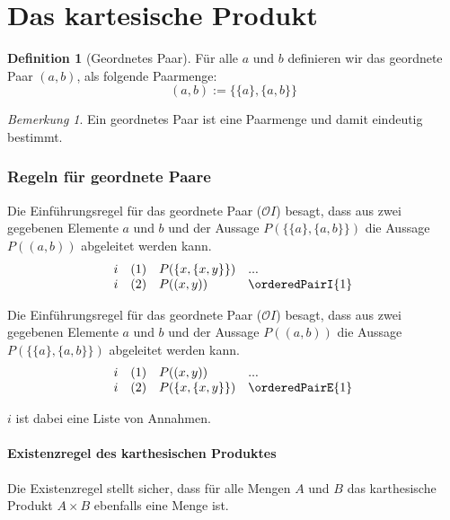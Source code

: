 \documentclass{book}
\theoremstyle{plain}
\theoremstyle{remark}
\newtheorem*{remark}{Bemerkung}
\theoremstyle{definition}
\newtheorem{definition}{Definition}[section]
\begin{document}
\section{Das kartesische Produkt}
\begin{definition}[Geordnetes Paar]
	Für alle \( a \) und \( b \) definieren wir das geordnete Paar \( (a,b) \), als folgende Paarmenge:
	\[
	(a, b) := \{ \{ a \}, \{ a, b \} \}
	\]
\end{definition}
\begin{remark}
	Ein geordnetes Paar ist eine Paarmenge und damit eindeutig bestimmt.
\end{remark}

\subsubsection{Regeln für geordnete Paare}
\label{rule:orderedPairI} \label{rule:orderedPairE}

Die Einführungsregel für das geordnete Paar (\( \mathcal{O}I \)) besagt, dass aus zwei gegebenen Elemente \( a \) und \( b \) und der Aussage \(P(\{ \{ a \}, \{ a, b \} \})\) die Aussage \(P((a,b))\) abgeleitet werden kann.
\[
\begin{array}{llll}
	i & (1) & P(\{x,\{x,y\}\}) & ... \\
	i & (2) & P((x,y)) & \orderedPairI{1} \\
\end{array}
\]

Die Einführungsregel für das geordnete Paar (\( \mathcal{O}I \)) besagt, dass aus zwei gegebenen Elemente \( a \) und \( b \) und der Aussage \(P((a,b))\) die Aussage \(P(\{ \{ a \}, \{ a, b \} \})\) abgeleitet werden kann.
\[
\begin{array}{llll}
	i & (1) & P((x,y)) & ... \\
	i & (2) & P(\{x,\{x,y\}\}) & \orderedPairE{1} \\
\end{array}
\]

\(i\) ist dabei eine Liste von Annahmen.

\paragraph{Existenzregel des karthesischen Produktes}
\label{rule:cartesianSetExists}
Die Existenzregel stellt sicher, dass für alle Mengen \(A\) und \(B\) das karthesische Produkt \(A\times B\) ebenfalls eine Menge ist.
\end{document}
